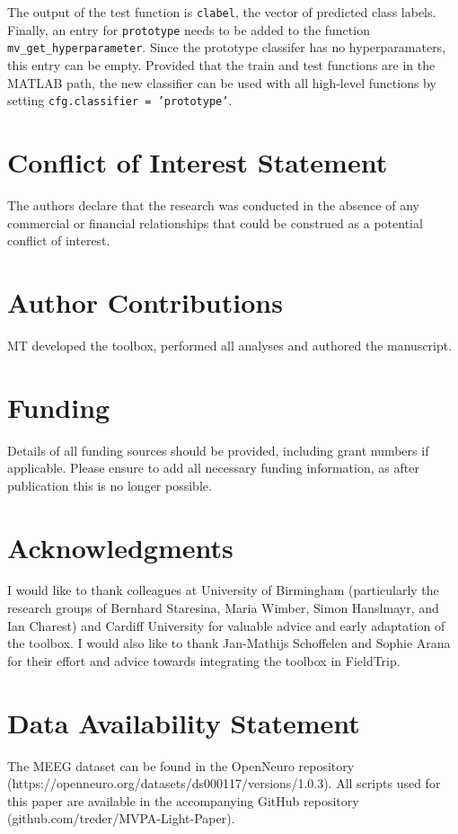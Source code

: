\documentclass[utf8]{frontiersSCNS} %
\newcommand{\ttt}[1]{\texttt{#1}}
\begin{document}
The output of the test function is \ttt{clabel}, the vector of predicted class labels. Finally, an entry for \ttt{prototype} needs to be added to the function \ttt{mv\_get\_hyperparameter}. Since the prototype classifer has no hyperparamaters, this entry can be empty. Provided that the train and test functions are in the MATLAB path, the new classifier can be used with all high-level functions by setting \ttt{cfg.classifier = 'prototype'}.


\section*{Conflict of Interest Statement}

The authors declare that the research was conducted in the absence of any commercial or financial relationships that could be construed as a potential conflict of interest.

\section*{Author Contributions}

MT developed the toolbox, performed all analyses and authored the manuscript.

\section*{Funding}
Details of all funding sources should be provided, including grant numbers if applicable. Please ensure to add all necessary funding information, as after publication this is no longer possible.

\section*{Acknowledgments}
I would like to thank colleagues at University of Birmingham (particularly the research groups of Bernhard Staresina, Maria Wimber, Simon Hanslmayr, and Ian Charest) and Cardiff University for valuable advice and early adaptation of the toolbox. I would also like to thank Jan-Mathijs Schoffelen and Sophie Arana for their effort and advice towards integrating the toolbox in FieldTrip.

\section*{Data Availability Statement}
The MEEG dataset can be found in the OpenNeuro repository (https://openneuro.org/datasets/ds000117/versions/1.0.3). All scripts used for this paper are available in the accompanying GitHub repository (github.com/treder/MVPA-Light-Paper).
\end{document}
